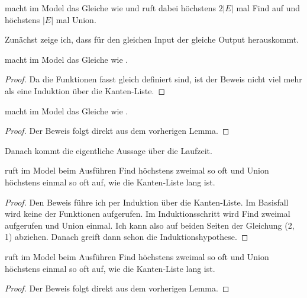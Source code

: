 \begin{theorem}
    \Kruskalkruskalprog macht im Model \Kruskalkruskalmodelone das Gleiche wie \Kruskalkruskal und ruft dabei höchstens $2 |E|$ mal Find auf und höchstens $|E|$ mal Union.
\end{theorem}

Zunächst zeige ich, dass für den gleichen Input der gleiche Output herauskommt.

\begin{lemma}[\Kruskalkruskalhelperevalone]\label{Kruskalkruskalhelperevalone}
  \Kruskalkruskalhelperprog macht im Model \Kruskalkruskalmodelone das Gleiche wie \Kruskalkruskalhelper.
\end{lemma}
\begin{proof}
  Da die Funktionen fasst gleich definiert sind, ist der Beweis nicht viel mehr als eine Induktion über die Kanten-Liste.
\end{proof}



\begin{lemma}[\Kruskalkruskalevalone]\label{Kruskalkruskalevalone}
  \Kruskalkruskalprog macht im Model \Kruskalkruskalmodelone das Gleiche wie \Kruskalkruskal.
\end{lemma}
\begin{proof}
  Der Beweis folgt direkt aus dem vorherigen Lemma.
\end{proof}

Danach kommt die eigentliche Aussage über die Laufzeit.

\begin{lemma}[\Kruskalkruskalhelpertimeone]
  \Kruskalkruskalhelperprog ruft im Model \Kruskalkruskalmodelone beim Ausführen Find höchstens zweimal so oft und Union höchstens einmal so oft auf, wie die Kanten-Liste lang ist.
\end{lemma}
\begin{proof}
  Den Beweis führe ich per Induktion über die Kanten-Liste.
  Im Basisfall wird keine der Funktionen aufgerufen.
  Im Induktionsschritt wird Find zweimal aufgerufen und Union einmal.
  Ich kann also auf beiden Seiten der Gleichung (2, 1) abziehen.
  Danach greift dann schon die Induktionshypothese.
\end{proof}



\begin{lemma}[\Kruskalkruskaltimeone]
  \Kruskalkruskalprog ruft im Model \Kruskalkruskalmodelone beim Ausführen Find höchstens zweimal so oft und Union höchstens einmal so oft auf, wie die Kanten-Liste lang ist.
\end{lemma}
\begin{proof}
  Der Beweis folgt direkt aus dem vorherigen Lemma.
\end{proof}

